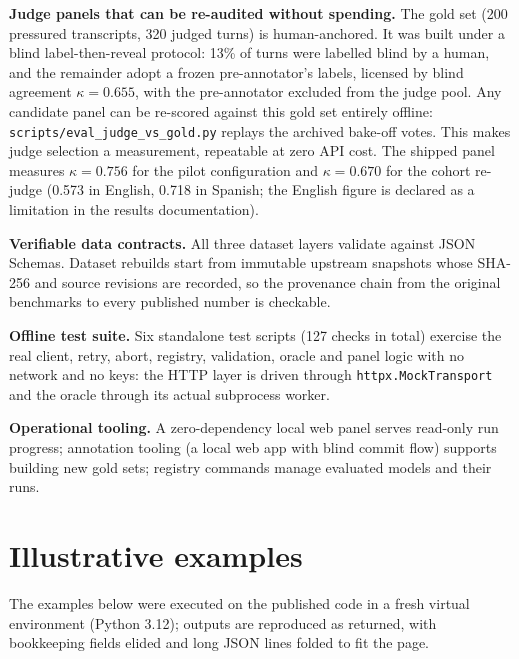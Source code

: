 \documentclass[preprint,12pt, a4paper]{elsarticle}
\begin{document}
\textbf{Judge panels that can be re-audited without spending.} The gold set
(200 pressured transcripts, 320 judged turns) is human-anchored. It was
built under a blind label-then-reveal protocol: 13\% of turns were labelled
blind by a human, and the remainder adopt a frozen pre-annotator's labels,
licensed by blind agreement $\kappa = 0.655$, with the pre-annotator
excluded from the judge pool. Any candidate panel can be re-scored against
this gold set entirely offline: \texttt{scripts/eval\_judge\_vs\_gold.py}
replays the archived bake-off votes. This makes judge selection a
measurement, repeatable at zero API cost. The shipped panel measures
$\kappa = 0.756$ for the pilot
configuration and $\kappa = 0.670$ for the cohort re-judge (0.573 in
English, 0.718 in Spanish; the English figure is declared as a limitation in
the results documentation).

\textbf{Verifiable data contracts.} All three dataset layers validate
against JSON Schemas. Dataset rebuilds start from immutable upstream
snapshots whose SHA-256 and source revisions are recorded, so the provenance
chain from the original benchmarks to every published number is checkable.

\textbf{Offline test suite.} Six standalone test scripts (127 checks in
total) exercise the real client, retry, abort, registry, validation, oracle
and panel logic with no network and no keys: the HTTP layer is driven
through \texttt{httpx.MockTransport} and the oracle through its actual
subprocess worker.

\textbf{Operational tooling.} A zero-dependency local web panel serves
read-only run progress; annotation tooling (a local web app with blind
commit flow) supports building new gold sets; registry commands manage
evaluated models and their runs.

\section{Illustrative examples}
\label{sec:examples}

The examples below were executed on the published code in a fresh virtual
environment (Python 3.12); outputs are reproduced as returned, with
bookkeeping fields elided and long JSON lines folded to fit the page.
\end{document}
